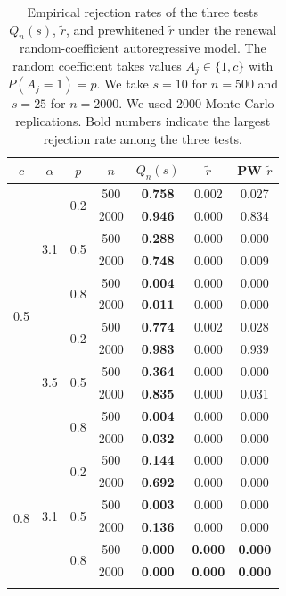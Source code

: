 \documentclass[12pt]{article}
\numberwithin{equation}{section}
\begin{document}
\begin{table}[H]
\centering
\caption{Empirical rejection rates of the three tests $Q_n(s)$, $\tilde r$, and prewhitened $\tilde r$ under the renewal random-coefficient autoregressive model. The random coefficient takes values $A_j\in\{1,c\}$ with $P(A_j=1)=p$. We take $s=10$ for $n=500$ and $s=25$ for $n=2000$. We used 2000 Monte-Carlo replications. Bold numbers indicate the largest rejection rate among the three tests.}
\label{tab:three_tests_rejection_rates_renewal_rcar}
\begin{tabular}{ccccccc}
\hline
$c$ & $\alpha$ & $p$ & $n$ & $Q_n(s)$ & $\tilde r$ & PW $\tilde r$\\
\hline

\multirow{12}{*}{0.5}
& \multirow{6}{*}{3.1}
& \multirow{2}{*}{0.2}
& 500  & \textbf{0.758} & 0.002 & 0.027 \\
&  &  & 2000 & \textbf{0.946} & 0.000 & 0.834 \\
\cline{3-7}
&  & \multirow{2}{*}{0.5}
& 500  & \textbf{0.288} & 0.000 & 0.000 \\
&  &  & 2000 & \textbf{0.748} & 0.000 & 0.009 \\
\cline{3-7}
&  & \multirow{2}{*}{0.8}
& 500  & \textbf{0.004} & 0.000 & 0.000 \\
&  &  & 2000 & \textbf{0.011} & 0.000 & 0.000 \\
\cline{2-7}

& \multirow{6}{*}{3.5}
& \multirow{2}{*}{0.2}
& 500  & \textbf{0.774} & 0.002 & 0.028 \\
&  &  & 2000 & \textbf{0.983} & 0.000 & 0.939 \\
\cline{3-7}
&  & \multirow{2}{*}{0.5}
& 500  & \textbf{0.364} & 0.000 & 0.000 \\
&  &  & 2000 & \textbf{0.835} & 0.000 & 0.031 \\
\cline{3-7}
&  & \multirow{2}{*}{0.8}
& 500  & \textbf{0.004} & 0.000 & 0.000 \\
&  &  & 2000 & \textbf{0.032} & 0.000 & 0.000 \\
\hline

\multirow{12}{*}{0.8}
& \multirow{6}{*}{3.1}
& \multirow{2}{*}{0.2}
& 500  & \textbf{0.144} & 0.000 & 0.000 \\
&  &  & 2000 & \textbf{0.692} & 0.000 & 0.000 \\
\cline{3-7}
&  & \multirow{2}{*}{0.5}
& 500  & \textbf{0.003} & 0.000 & 0.000 \\
&  &  & 2000 & \textbf{0.136} & 0.000 & 0.000 \\
\cline{3-7}
&  & \multirow{2}{*}{0.8}
& 500  & \textbf{0.000} & \textbf{0.000} & \textbf{0.000} \\
&  &  & 2000 & \textbf{0.000} & \textbf{0.000} & \textbf{0.000} \\
\cline{2-7}


\end{tabular}
\end{table}
\end{document}
